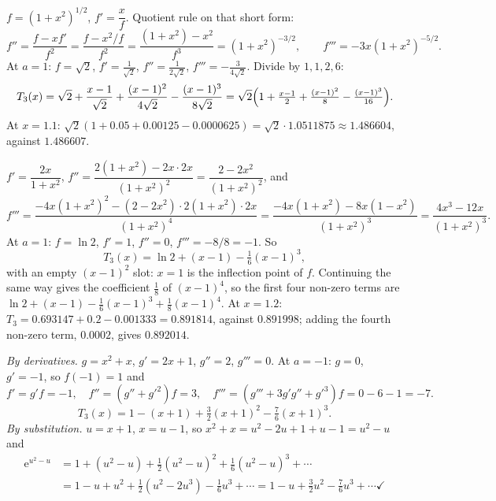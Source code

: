 \begin{solutions}
  \item $f=(1+x^{2})^{1/2}$, $f'=\dfrac{x}{f}$. Quotient rule on that
        short form:
        \[
          f''=\frac{f-xf'}{f^{2}}=\frac{f-x^{2}/f}{f^{2}}
             =\frac{(1+x^{2})-x^{2}}{f^{3}}=(1+x^{2})^{-3/2},
          \qquad
          f'''=-3x(1+x^{2})^{-5/2} .
        \]
        At $a=1$: $f=\sqrt2$, $f'=\tfrac{1}{\sqrt2}$,
        $f''=\tfrac{1}{2\sqrt2}$, $f'''=-\tfrac{3}{4\sqrt2}$. Divide by
        $1,1,2,6$:
        \[
          T_{3}(x)=\sqrt2+\frac{x-1}{\sqrt2}+\frac{(x-1)^{2}}{4\sqrt2}
                   -\frac{(x-1)^{3}}{8\sqrt2}
                  =\sqrt2\Bigl(1+\tfrac{x-1}{2}+\tfrac{(x-1)^{2}}{8}
                   -\tfrac{(x-1)^{3}}{16}\Bigr) .
        \]
        At $x=1.1$: $\sqrt2(1+0.05+0.00125-0.0000625)=\sqrt2\cdot1.0511875
        \approx1.486604$, against $1.486607$.

  \item $f'=\dfrac{2x}{1+x^{2}}$,
        $f''=\dfrac{2(1+x^{2})-2x\cdot2x}{(1+x^{2})^{2}}
        =\dfrac{2-2x^{2}}{(1+x^{2})^{2}}$, and
        \[
          f'''=\frac{-4x(1+x^{2})^{2}-(2-2x^{2})\cdot2(1+x^{2})\cdot2x}
                {(1+x^{2})^{4}}
              =\frac{-4x(1+x^{2})-8x(1-x^{2})}{(1+x^{2})^{3}}
              =\frac{4x^{3}-12x}{(1+x^{2})^{3}} .
        \]
        At $a=1$: $f=\ln2$, $f'=1$, $f''=0$, $f'''=-8/8=-1$. So
        \[
          T_{3}(x)=\ln2+(x-1)-\tfrac16(x-1)^{3} ,
        \]
        with an empty $(x-1)^{2}$ slot: $x=1$ is the inflection point of
        $f$. Continuing the same way gives the coefficient $\tfrac18$ of
        $(x-1)^{4}$, so the first four non-zero terms are
        $\ln2+(x-1)-\tfrac16(x-1)^{3}+\tfrac18(x-1)^{4}$. At $x=1.2$:
        $T_{3}=0.693147+0.2-0.001333=0.891814$, against $0.891998$; adding
        the fourth non-zero term, $0.0002$, gives $0.892014$.

  \item \emph{By derivatives.} $g=x^{2}+x$, $g'=2x+1$, $g''=2$,
        $g'''=0$. At $a=-1$: $g=0$, $g'=-1$, so $f(-1)=1$ and
        \[
          f'=g'f=-1,\quad f''=(g''+g'^{2})f=3,\quad
          f'''=(g'''+3g'g''+g'^{3})f=0-6-1=-7 .
        \]
        \[
          T_{3}(x)=1-(x+1)+\tfrac32(x+1)^{2}-\tfrac76(x+1)^{3} .
        \]
        \emph{By substitution.} $u=x+1$, $x=u-1$, so
        $x^{2}+x=u^{2}-2u+1+u-1=u^{2}-u$ and
        \[\begin{aligned}
          \mathrm{e}^{u^{2}-u}&=1+(u^{2}-u)+\tfrac12(u^{2}-u)^{2}
            +\tfrac16(u^{2}-u)^{3}+\cdots\\
          &=1-u+u^{2}+\tfrac12(u^{2}-2u^{3})-\tfrac16u^{3}+\cdots
          =1-u+\tfrac32u^{2}-\tfrac76u^{3}+\cdots \checkmark
        \end{aligned}\]


\end{solutions}
